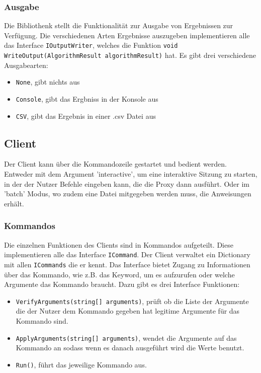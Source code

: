\subsubsection{Ausgabe}

Die Bibliothenk stellt die Funktionalität zur Ausgabe von Ergebnissen zur Verfügung. Die verschiedenen Arten Ergebnisse auszugeben implementieren alle
das Interface \verb|IOutputWriter|, welches die Funktion \verb|void WriteOutput(AlgorithmResult algorithmResult)| hat. Es gibt drei verschiedene Ausgabearten:

\begin{itemize}
  \item \verb|None|, gibt nichts aus
  \item \verb|Console|, gibt das Ergbniss in der Konsole aus
  \item \verb|CSV|, gibt das Ergebnis in einer .csv Datei aus
\end{itemize}


\subsection{Client}

Der Client kann über die Kommandozeile gestartet und bedient werden. Entweder mit dem Argument 'interactive', um eine interaktive Sitzung zu starten,
in der der Nutzer Befehle eingeben kann, die die Proxy dann ausführt. Oder im 'batch' Modus, wo zudem eine Datei mitgegeben werden muss, die Anweisungen erhält.

\subsubsection{Kommandos}

Die einzelnen Funktionen des Clients sind in Kommandos aufgeteilt.
Diese implementieren alle das Interface \verb|ICommand|. Der Client verwaltet ein Dictionary mit allen \verb|ICommands| die er kennt.
Das Interface bietet Zugang zu Informationen über das Kommando, wie z.B. das Keyword, um es aufzurufen oder welche Argumente das Kommando braucht.
Dazu gibt es drei Interface Funktionen:

\begin{itemize}
  \item \verb|VerifyArguments(string[] arguments)|, prüft ob die Liste der Argumente die der Nutzer dem Kommando gegeben hat legitime Argumente für das Kommando sind.
  \item \verb|ApplyArguments(string[] arguments)|, wendet die Argumente auf das Kommando an sodass wenn es danach ausgeführt wird die Werte benutzt.
  \item \verb|Run()|, führt das jeweilige Kommando aus.
\end{itemize}

